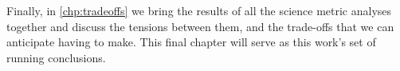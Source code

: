 Finally, in \autoref{chp:tradeoffs} we bring the results of all the
science metric analyses  together and discuss the tensions between
them, and the trade-offs that we can anticipate having to make.
This final chapter will serve as this work's set of running conclusions.


\navigationbar



%
%
%
%
%
%
%
%
% 
%

